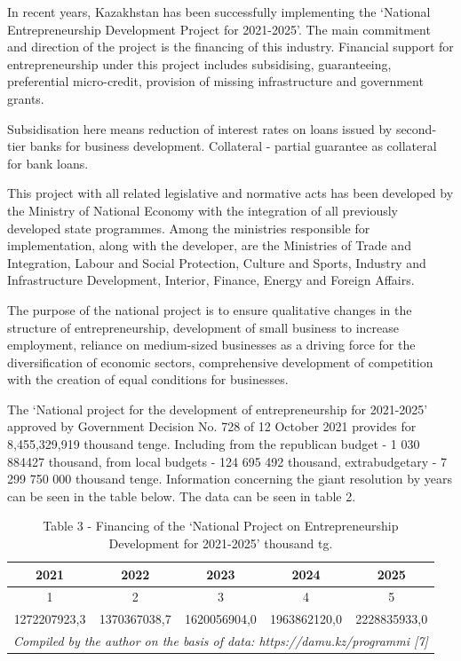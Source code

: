 \begin{multicols}{2}
In recent years, Kazakhstan has been successfully implementing the
`National Entrepreneurship Development Project for 2021-2025'. The main
commitment and direction of the project is the financing of this
industry. Financial support for entrepreneurship under this project
includes subsidising, guaranteeing, preferential micro-credit, provision
of missing infrastructure and government grants.

Subsidisation here means reduction of interest rates on loans issued by
second-tier banks for business development. Collateral - partial
guarantee as collateral for bank loans.

This project with all related legislative and normative acts has been
developed by the Ministry of National Economy with the integration of
all previously developed state programmes. Among the ministries
responsible for implementation, along with the developer, are the
Ministries of Trade and Integration, Labour and Social Protection,
Culture and Sports, Industry and Infrastructure Development, Interior,
Finance, Energy and Foreign Affairs.

The purpose of the national project is to ensure qualitative changes in
the structure of entrepreneurship, development of small business to
increase employment, reliance on medium-sized businesses as a driving
force for the diversification of economic sectors, comprehensive
development of competition with the creation of equal conditions for
businesses.

The `National project for the development of entrepreneurship for
2021-2025' approved by Government Decision No. 728 of 12 October 2021
provides for 8,455,329,919 thousand tenge. Including from the republican
budget - 1 030 884427 thousand, from local budgets - 124 695 492
thousand, extrabudgetary - 7 299 750 000 thousand tenge. Information
concerning the giant resolution by years can be seen in the table below.
The data can be seen in table 2.
\end{multicols}

\begin{table}[H]
\caption*{Table 3 - Financing of the `National Project on Entrepreneurship Development for 2021-2025' thousand tg.}
\centering
\begin{tabular}{|llllc|}
\hline
\multicolumn{1}{|c|}{2021} & \multicolumn{1}{c|}{2022} & \multicolumn{1}{c|}{2023} & \multicolumn{1}{c|}{2024} & 2025 \\ \hline
\multicolumn{1}{|c|}{1}    & \multicolumn{1}{c|}{2}    & \multicolumn{1}{c|}{3}    & \multicolumn{1}{c|}{4}    & 5    \\ \hline
\multicolumn{1}{|c|}{1272207923,3} &
  \multicolumn{1}{c|}{1370367038,7} &
  \multicolumn{1}{c|}{1620056904,0} &
  \multicolumn{1}{c|}{1963862120,0} &
  \multicolumn{1}{c|}{2228835933,0} \\ \hline
\multicolumn{5}{|l|}{\textit{Compiled by the author on the basis of data: https://damu.kz/programmi {[}7{]}}}         \\ \hline
\end{tabular}
\end{table}


